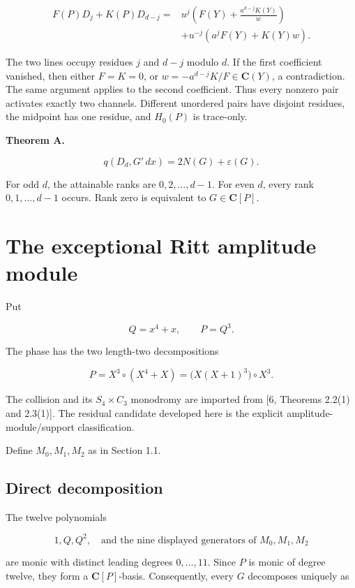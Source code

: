 \documentclass[
  11pt,
  a4paper,
]{amsart}
\begin{document}
\[
\begin{aligned}
F(P)D_j+K(P)D_{d-j}
={}&u^j\left(F(Y)+\frac{a^{d-j}K(Y)}{w}\right)\\
 &+u^{-j}\left(a^jF(Y)+K(Y)w\right).
\end{aligned}                                           \tag{3.3}
\]

The two lines occupy residues \(j\) and \(d-j\) modulo \(d\). If the
first coefficient vanished, then either \(F=K=0\), or
\(w=-a^{d-j}K/F\in\mathbf C(Y)\), a contradiction. The same argument
applies to the second coefficient. Thus every nonzero pair activates
exactly two channels. Different unordered pairs have disjoint residues,
the midpoint has one residue, and \(H_0(P)\) is trace-only.

\textbf{Theorem A.}

\[
\boxed{q(D_d,G'\,dx)=2N(G)+\varepsilon(G).}              \tag{3.4}
\]

For odd \(d\), the attainable ranks are \(0,2,\ldots,d-1\). For even
\(d\), every rank \(0,1,\ldots,d-1\) occurs. Rank zero is equivalent to
\(G\in\mathbf C[P]\).

\section{The exceptional Ritt amplitude module}

Put

\[
Q=x^4+x,\qquad P=Q^3.
\]

The phase has the two length-two decompositions

\[
P=X^3\circ(X^4+X)
=\bigl(X(X+1)^3\bigr)\circ X^3.                         \tag{4.0}
\]

The collision and its \(S_4\times C_3\) monodromy are imported from
{[}6, Theorems 2.2(1) and 2.3(1){]}. The residual candidate developed
here is the explicit amplitude-module/support classification.

Define \(M_0,M_1,M_2\) as in Section 1.1.

\subsection{Direct decomposition}

The twelve polynomials

\[
1,Q,Q^2,\quad\text{and the nine displayed generators of }M_0,M_1,M_2
\]

are monic with distinct leading degrees \(0,\ldots,11\). Since \(P\) is
monic of degree twelve, they form a \(\mathbf C[P]\)-basis.
Consequently, every \(G\) decomposes uniquely as
\end{document}

